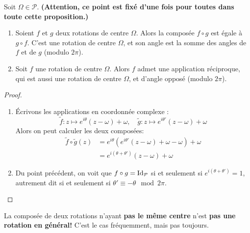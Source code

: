 \begin{proposition}
Soit $\Omega\in\mathcal P$. \textbf{(Attention, ce point est fixé d'une fois pour toutes dans toute cette proposition.)}
\begin{enumerate}
\item Soient $f$ et $g$ deux rotations de centre $\Omega$. Alors la composée $f\circ g$ est égale à $g \circ f$. C'est une rotation de centre $\Omega$, et son angle est la somme des angles de $f$ et de $g$ (modulo $2\pi$).
\item Soit $f$ une rotation de centre $\Omega$. Alors $f$ admet une application réciproque, qui est aussi une rotation de centre $\Omega$, et d'angle opposé (modulo $2\pi$).
\end{enumerate}
\end{proposition}
\begin{proof}
\begin{enumerate}
\item Écrivons les applications en coordonnée complexe :
\[
\tilde f : z\mapsto e^{i\theta}(z-\omega)+\omega,\quad
\tilde g : z\mapsto e^{i\theta'}(z-\omega)+\omega
\]
Alors on peut calculer les deux composées:
\begin{align*}
\tilde f\circ \tilde g(z)
&=e^{i\theta}(e^{i\theta'}(z-\omega)+\omega-\omega)+\omega\\
&=e^{i(\theta+\theta')}(z-\omega)+\omega
\end{align*}
\item Du point précédent, on voit que $f\circ g=\operatorname{Id}_{\mathcal P}$ si et seulement si $e^{i(\theta+\theta')}=1$, autrement dit si et seulement si $\theta'\equiv -\theta\mod 2\pi$.
\end{enumerate}
\end{proof}



\begin{attention}
La composée de deux rotations n'ayant \textbf{pas le même centre} n'est \textbf{pas une rotation en général!} C'est le cas fréquemment, mais pas toujours.
\end{attention}

